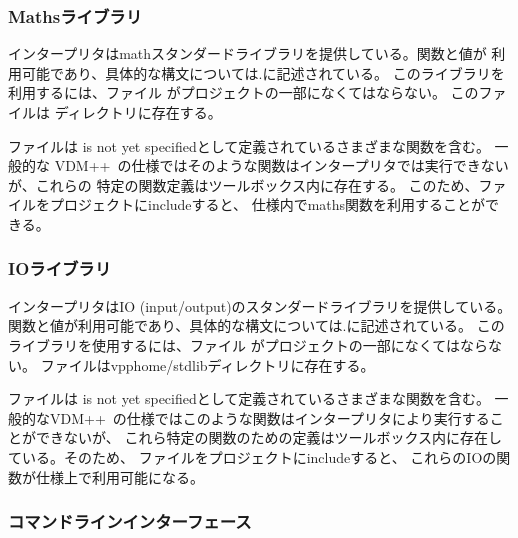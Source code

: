 \documentclass[\pformat,12pt]{jarticle}
\newcommand{\vdmslpp}{VDM++}
\newcommand{\keyw}[1]{{\sf #1}}
\begin{document}
\subsubsection*{Mathsライブラリ}


インタープリタはmathスタンダードライブラリを提供している。関数と値が
利用可能であり、具体的な構文については\cite{LangMan-SCSK}.に記述されている。
このライブラリを利用するには、ファイル
がプロジェクトの一部になくてはならない。
このファイルは ディレクトリに存在する。

ファイルは
\keyw{is not yet specified}として定義されているさまざまな関数を含む。
一般的な \vdmslpp\ の仕様ではそのような関数はインタープリタでは実行できないが、これらの
特定の関数定義はツールボックス内に存在する。
このため、ファイルをプロジェクトにincludeすると、
仕様内でmaths関数を利用することができる。

\subsubsection*{IOライブラリ}


インタープリタはIO (input/output)のスタンダードライブラリを提供している。
関数と値が利用可能であり、具体的な構文については\cite{LangMan-SCSK}.に記述されている。
このライブラリを使用するには、ファイル
がプロジェクトの一部になくてはならない。
ファイルはvpphome/stdlibディレクトリに存在する。

ファイルは
\keyw{is not yet specified}として定義されているさまざまな関数を含む。
一般的な\vdmslpp\ の仕様ではこのような関数はインタープリタにより実行することができないが、
これら特定の関数のための定義はツールボックス内に存在している。そのため、
ファイルをプロジェクトにincludeすると、
これらのIOの関数が仕様上で利用可能になる。

\subsubsection{コマンドラインインターフェース}\label{subsec:intercom}
\end{document}
